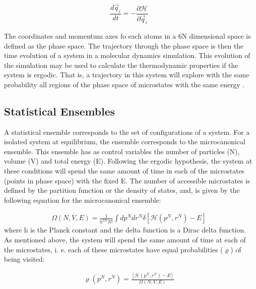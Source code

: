 \begin{equation}
\frac{d \vec{q}_{i}}{dt} = - \frac{\partial \mathcal{H}}{\partial \vec{q}_{i}}
\end{equation}

The coordinates and momentum axes fo each atoms in a 6N dimensional space is defined as the phase space. The trajectory through the phase space is then the time evolution of a system in a molecular dynamics simulation. This evolution of the simulation may be used to calculate the thermodynamic properties if the system is ergodic. That is, a trajectory in this system will explore with the same probability all regions of the phase space of microstates with the same energy \cite{shell2015}. 

\subsection{Statistical Ensembles}

A statistical ensemble corresponds to the set of configurations of a system. For a isolated system at equilibrium, the ensemble  corresponds  to the microcanonical ensemble. This ensemble has as control variables the number of particles (N), volume (V) and total energy (E). Following the ergodic hypothesis, the system at these conditions will spend the same amount of time in each of the microstates (points in phase space) with the fixed E.  The number of accessible microstates is defined by the partition function or the density of states, and,  is given by the following equation  for the microcanonical ensemble: 

\begin{equation}
\begin{aligned}
 \Omega (N,V,E) = \frac{1}{h^{3N}N!} \int dp^{N} dr^{N} \delta [\mathcal{H}(p^{N},r^{N}) -E]
\end{aligned}
\end{equation}
where h is the Planck constant and the delta function is a Dirac delta function. As mentioned above, the system will spend the same amount of time at each of the microstates, i. e. each of these microstates have equal probabilities ($\varrho$) of being visited:

\begin{equation}
\begin{aligned}
\varrho (p^{N},r^{N}) = \frac{[\mathcal{H}(p^{N},r^{N}) -E]}{ \Omega (N,V,E)} 
\end{aligned}
\end{equation}

